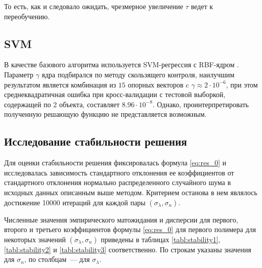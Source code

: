 \documentclass[12pt,a4paper]{article}
\begin{document}
То есть, как и следовало ожидать, чрезмерное увеличение $\tau$ ведет к переобучению.

\subsection{SVM}

В качестве базового алгоритма используется SVM-регрессия с RBF-ядром \cite{Vapnik79}.
Параметр $\gamma$ ядра подбирался по методу скользящего контроля, наилучшим результатом является
комбинация из $15$ опорных векторов c $\gamma \approx 2 \cdot 10^{-6}$, при этом
среднеквадратичная ошибка при кросс-валидации с тестовой выборкой, содержащей по 2
объекта, составляет $8.96 \cdot 10^{-8}$. Однако, проинтерпретировать полученную
решающую функцию не представляется возможным.

\subsection{Исследование стабильности решения}

Для оценки стабильности решения фиксировалась формула \eqref{eq:res_0} и исследовалась
зависимость стандартного отклонения ее коэффициентов от стандартного отклонения
нормально распределенного случайного шума в исходных данных описанным выше методом.
Критерием останова в нем являлось достижение 10000 итераций для каждой пары
$(\sigma_{\lambda}, \sigma_n)$.

Численные значения эмпирического матожидания и дисперсии для первого, второго и третьего
коэффициентов формулы \eqref{eq:res_0} для первого полимера для некоторых значений
$(\sigma_{\lambda}, \sigma_n)$ приведены в таблицах \ref{tabl:stability1},
\ref{tabl:stability2} и \ref{tabl:stability3} соответственно. По строкам указаны значения
для $\sigma_n$, по столбцам~--- для $\sigma_{\lambda}$.
\end{document}
